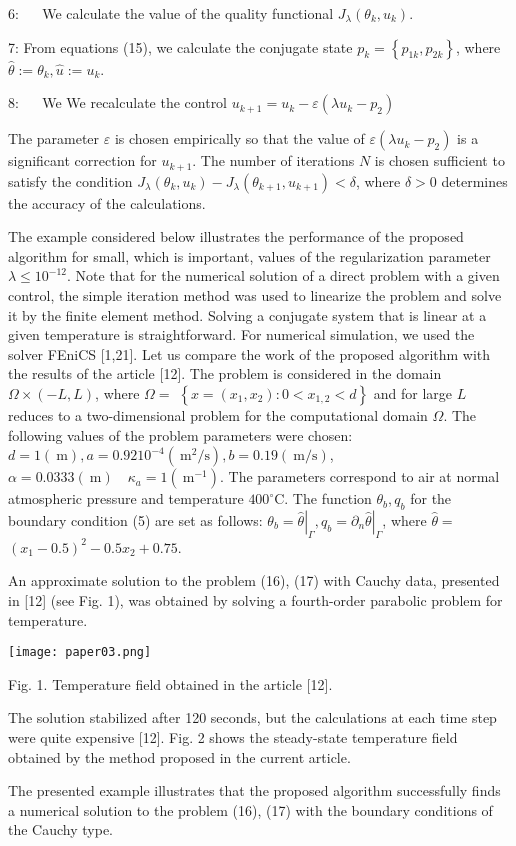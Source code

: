 6: $\quad$ We calculate the value of the quality functional $J_{\lambda}\left(\theta_{k}, u_{k}\right)$.

7: From equations (15), we calculate the conjugate state $p_{k}=\left\{p_{1 k}, p_{2 k}\right\}$, where $\widehat{\theta}:=\theta_{k}, \widehat{u}:=u_{k}$.

8: $\quad$ We We recalculate the control $u_{k+1}=u_{k}-\varepsilon\left(\lambda u_{k}-p_{2}\right)$

The parameter $\varepsilon$ is chosen empirically so that the value of $\varepsilon\left(\lambda u_{k}-p_{2}\right)$ is a significant correction for $u_{k+1}$. The number of iterations $N$ is chosen sufficient to satisfy the condition $J_{\lambda}\left(\theta_{k}, u_{k}\right)-J_{\lambda}\left(\theta_{k+1}, u_{k+1}\right)<\delta$, where $\delta>0$ determines the accuracy of the calculations.

The example considered below illustrates the performance of the proposed algorithm for small, which is important, values of the regularization parameter $\lambda \leq 10^{-12}$. Note that for the numerical solution of a direct problem with a given control, the simple iteration method was used to linearize the problem and solve it by the finite element method. Solving a conjugate system that is linear at a given temperature is straightforward. For numerical simulation, we used the solver FEniCS [1,21]. Let us compare the work of the proposed algorithm with the results of the article [12]. The problem is considered in the domain $\Omega \times(-L, L)$, where $\Omega=$ $\left\{x=\left(x_{1}, x_{2}\right): 0<x_{1,2}<d\right\}$ and for large $L$ reduces to a two-dimensional problem for the computational domain $\Omega$. The following values of the problem parameters were chosen: $d=1(\mathrm{~m}), a=0.9210^{-4}\left(\mathrm{~m}^{2} / \mathrm{s}\right), b=0.19(\mathrm{~m} / \mathrm{s})$, $\alpha=0.0333(\mathrm{~m}) \quad \kappa_{a}=1\left(\mathrm{~m}^{-1}\right)$. The parameters correspond to air at normal atmospheric pressure and temperature $400^{\circ} \mathrm{C}$. The function $\theta_{b}, q_{b}$ for the boundary condition (5) are set as follows: $\theta_{b}=\left.\widehat{\theta}\right|_{\Gamma}, q_{b}=\left.\partial_{n} \widehat{\theta}\right|_{\Gamma}$, where $\widehat{\theta}=$ $\left(x_{1}-0.5\right)^{2}-0.5 x_{2}+0.75$.

An approximate solution to the problem (16), (17) with Cauchy data, presented in [12] (see Fig. 1), was obtained by solving a fourth-order parabolic problem for temperature.

\begin{center}
\texttt{[image: paper03.png]}
\end{center}

Fig. 1. Temperature field obtained in the article [12].

The solution stabilized after 120 seconds, but the calculations at each time step were quite expensive [12]. Fig. 2 shows the steady-state temperature field obtained by the method proposed in the current article.

The presented example illustrates that the proposed algorithm successfully finds a numerical solution to the problem (16), (17) with the boundary conditions of the Cauchy type.
